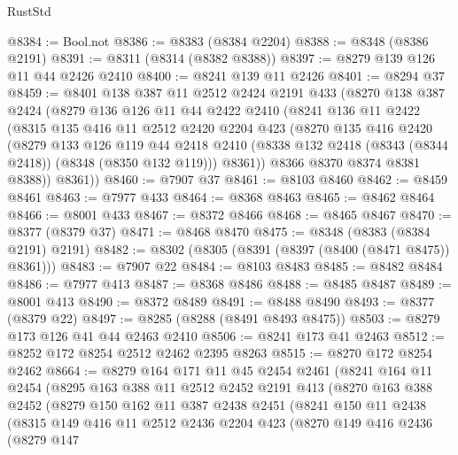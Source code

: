 \begin{lexlean}{RustStd}
\begin{coremodule}
{\begin{coremodule}
{{{{{{{{{{{{{{{{{{{{{{{{{{{{{{{{{{{{{{{{{{{{{{{{{{@8384 := Bool.not
@8386 := @8383 (@8384 @2204)
@8388 := @8348 (@8386 @2191)
@8391 := @8311 (@8314 (@8382 @8388))
@8397 := @8279 @139 @126 @11 @44 @2426 @2410
@8400 := @8241 @139 @11 @2426
@8401 := @8294 @37
@8459 := @8401
    @138
    @387
    @11
    @2512
    @2424
    @2191
    @433
    (@8270
      @138
      @387
      @2424
      (@8279
        @136
        @126
        @11
        @44
        @2422
        @2410
        (@8241
          @136
          @11
          @2422
          (@8315
            @135
            @416
            @11
            @2512
            @2420
            @2204
            @423
            (@8270
              @135
              @416
              @2420
              (@8279
                @133
                @126
                @119
                @44
                @2418
                @2410
                (@8338 @132 @2418 (@8343 (@8344 @2418)) (@8348 (@8350 @132 @119)))
                @8361))
            @8366
            @8370
            @8374
            @8381
            @8388))
        @8361))
@8460 := @7907 @37
@8461 := @8103 @8460
@8462 := @8459 @8461
@8463 := @7977 @433
@8464 := @8368 @8463
@8465 := @8462 @8464
@8466 := @8001 @433
@8467 := @8372 @8466
@8468 := @8465 @8467
@8470 := @8377 (@8379 @37)
@8471 := @8468 @8470
@8475 := @8348 (@8383 (@8384 @2191) @2191)
@8482 := @8302 (@8305 (@8391 (@8397 (@8400 (@8471 @8475)) @8361)))
@8483 := @7907 @22
@8484 := @8103 @8483
@8485 := @8482 @8484
@8486 := @7977 @413
@8487 := @8368 @8486
@8488 := @8485 @8487
@8489 := @8001 @413
@8490 := @8372 @8489
@8491 := @8488 @8490
@8493 := @8377 (@8379 @22)
@8497 := @8285 (@8288 (@8491 @8493 @8475))
@8503 := @8279 @173 @126 @41 @44 @2463 @2410
@8506 := @8241 @173 @41 @2463
@8512 := @8252 @172 @8254 @2512 @2462 @2395 @8263
@8515 := @8270 @172 @8254 @2462
@8664 := @8279
    @164
    @171
    @11
    @45
    @2454
    @2461
    (@8241
      @164
      @11
      @2454
      (@8295
        @163
        @388
        @11
        @2512
        @2452
        @2191
        @413
        (@8270
          @163
          @388
          @2452
          (@8279
            @150
            @162
            @11
            @387
            @2438
            @2451
            (@8241
              @150
              @11
              @2438
              (@8315
                @149
                @416
                @11
                @2512
                @2436
                @2204
                @423
                (@8270
                  @149
                  @416
                  @2436
                  (@8279
                    @147
}}}}}}}}}}}}}}}}}}}}}}}}}}}}}}}}}}}}}}}}}}}}}}}}}}
\end{coremodule}}
\end{coremodule}
\end{lexlean}
